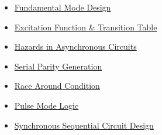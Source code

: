 \documentclass[12pt]{article}
\begin{document}
\begin{tcolorbox}[breakable,colback=cC!5,colframe=cC,boxrule=1pt,arc=5pt,
  left=8pt,right=8pt,top=8pt,bottom=8pt,before skip=4pt]
\begin{itemize}[leftmargin=1.2em,itemsep=1pt,label={\textcolor{cC}{$\triangleright$}}]
\begin{itemize}[leftmargin=1.5em,itemsep=0pt,label={\textcolor{cC}{$\cdot$}}]
        \item \hyperref[sub:s6-fundamental]{Fundamental Mode Design}
        \item \hyperref[sub:s6-excitation]{Excitation Function \& Transition Table}
        \item \hyperref[sub:s6-hazards]{Hazards in Asynchronous Circuits}
        \item \hyperref[sub:s6-parity]{Serial Parity Generation}
        \item \hyperref[sub:s6-race]{Race Around Condition}
        \item \hyperref[sub:s6-pulse]{Pulse Mode Logic}
        \item \hyperref[sub:s6-sync-design]{Synchronous Sequential Circuit Design}
      \end{itemize}
  \end{itemize}
\end{tcolorbox}
\end{document}
